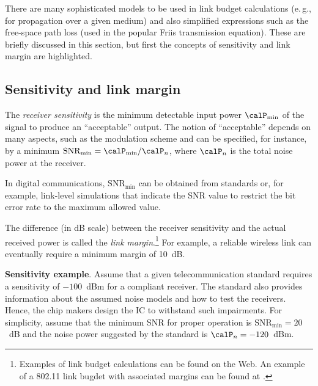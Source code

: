 There are many sophisticated models to be used in link budget calculations (e.\,g., for propagation over a given medium) and also simplified expressions such as the free-space path loss (used in the popular Friis transmission equation). These are briefly discussed in this section, but first
the concepts of sensitivity and link margin are highlighted.

\subsection{Sensitivity and link margin}
\label{sec:sensitivity}
The \emph{receiver sensitivity} is the minimum detectable input power $\calP_{\textrm{min}}$ of the signal to produce an ``acceptable'' output. The notion of ``acceptable'' depends on many aspects, such
as the modulation scheme and can be specified, for instance, 
by a minimum $\textrm{SNR}_{\textrm{min}} = \calP_{\textrm{min}} / \calP_n$, where $\calP_n$ is the
total noise power at the receiver.

In digital communications, $\textrm{SNR}_{\textrm{min}}$ can be obtained from standards
or, for example, link-level simulations that indicate the SNR value to restrict the 
bit error rate to the maximum allowed value. 

The difference (in dB scale) between the receiver sensitivity and the actual received power is called the \emph{link margin}.\footnote{Examples of link budget calculations can be found on the Web. An example of a 802.11 link bugdet with associated margins can be found at .} For example, a reliable wireless link can eventually require a minimum margin of 10~dB.




\bExample \textbf{Sensitivity example}. 
\label{ex:gsmsensitivy}
Assume that a given telecommunication standard requires a sensitivity of $-100$~dBm 
for a compliant 
receiver. The standard also provides information about the assumed noise models and
how to test the receivers. Hence, the chip makers design the IC to withstand such
impairments. For simplicity, assume that the minimum SNR for
proper operation is $\textrm{SNR}_{\textrm{min}}=20$~dB and the noise power
suggested by the standard is $\calP_n=-120$~dBm. 

